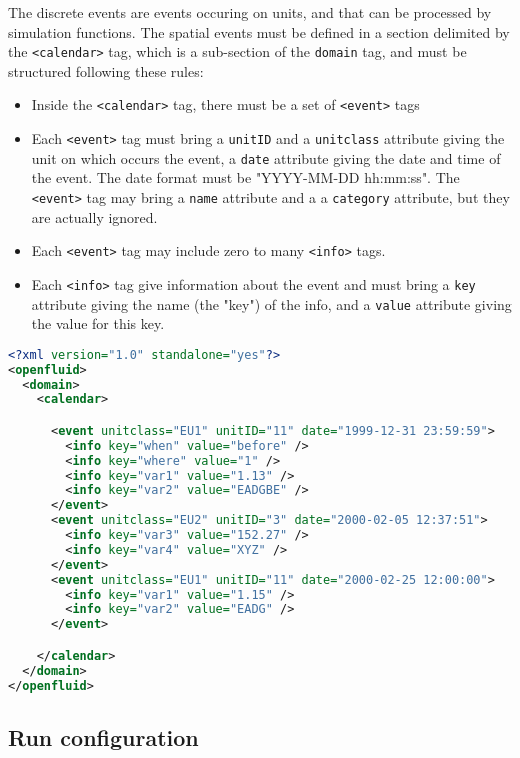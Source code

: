 The discrete events are events occuring on units, and that can be processed by simulation functions. 
\noindent The spatial events must be defined in a section delimited
by the \texttt{<calendar>} tag, which is a sub-section of the \texttt{domain}
tag, and must be structured following these rules:

\begin{itemize}
  \item Inside the \texttt{<calendar>} tag, there must be a set of \texttt{<event>} tags 
  \item Each \texttt{<event>} tag must bring a \texttt{unitID} and a 
  \texttt{unitclass} attribute giving the unit on which occurs the event, a 
  \texttt{date} attribute giving the date and time of the event. The date
  format must be "YYYY-MM-DD hh:mm:ss". The \texttt{<event>} tag may bring a
  \texttt{name} attribute and a a \texttt{category} attribute, but they are
  actually ignored.
  \item Each \texttt{<event>} tag may include zero to many \texttt{<info>} tags.
  \item Each \texttt{<info>} tag give information about the event and must
  bring a \texttt{key} attribute giving the name (the "key") of the info, and a
  \texttt{value} attribute giving the value for this key.
\end{itemize}  
  
\begin{lstlisting}[language=xml,title=\footnotesize\textit{example}]
<?xml version="1.0" standalone="yes"?>
<openfluid>
  <domain>
    <calendar>

      <event unitclass="EU1" unitID="11" date="1999-12-31 23:59:59">
        <info key="when" value="before" />
        <info key="where" value="1" />
        <info key="var1" value="1.13" />
        <info key="var2" value="EADGBE" />
      </event>
      <event unitclass="EU2" unitID="3" date="2000-02-05 12:37:51">
        <info key="var3" value="152.27" />
        <info key="var4" value="XYZ" />
      </event>
      <event unitclass="EU1" unitID="11" date="2000-02-25 12:00:00">
        <info key="var1" value="1.15" />
        <info key="var2" value="EADG" />
      </event>

    </calendar>
  </domain>
</openfluid>
\end{lstlisting}
\bigskip

\subsection{Run configuration}

